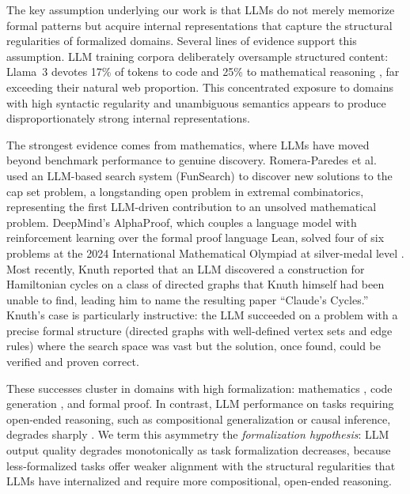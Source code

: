 \documentclass[runningheads]{llncs}
\begin{document}
The key assumption underlying our work is that LLMs do not merely memorize formal patterns but acquire internal representations that capture the structural regularities of formalized domains. Several lines of evidence support this assumption. LLM training corpora deliberately oversample structured content: Llama~3 devotes 17\% of tokens to code and 25\% to mathematical reasoning \cite{dubey2024llama}, far exceeding their natural web proportion. This concentrated exposure to domains with high syntactic regularity and unambiguous semantics appears to produce disproportionately strong internal representations.

The strongest evidence comes from mathematics, where LLMs have moved beyond benchmark performance to genuine discovery. Romera-Paredes et al.\ \cite{romeraparedes2024funsearch} used an LLM-based search system (FunSearch) to discover new solutions to the cap set problem, a longstanding open problem in extremal combinatorics, representing the first LLM-driven contribution to an unsolved mathematical problem. DeepMind's AlphaProof, which couples a language model with reinforcement learning over the formal proof language Lean, solved four of six problems at the 2024 International Mathematical Olympiad at silver-medal level \cite{alphaproof2024imo}. Most recently, Knuth \cite{knuth2026claude} reported that an LLM discovered a construction for Hamiltonian cycles on a class of directed graphs that Knuth himself had been unable to find, leading him to name the resulting paper ``Claude's Cycles.'' Knuth's case is particularly instructive: the LLM succeeded on a problem with a precise formal structure (directed graphs with well-defined vertex sets and edge rules) where the search space was vast but the solution, once found, could be verified and proven correct.

These successes cluster in domains with high formalization: mathematics \cite{cobbe2021training}, code generation \cite{chen2021evaluating}, and formal proof. In contrast, LLM performance on tasks requiring open-ended reasoning, such as compositional generalization or causal inference, degrades sharply \cite{dziri2023faith}. We term this asymmetry the \emph{formalization hypothesis}: LLM output quality degrades monotonically as task formalization decreases, because less-formalized tasks offer weaker alignment with the structural regularities that LLMs have internalized and require more compositional, open-ended reasoning.
\end{document}
